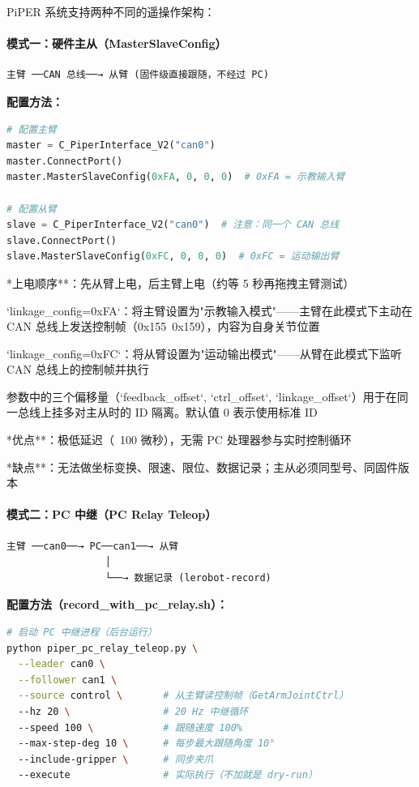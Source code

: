 \documentclass[UTF8,a4paper,11pt]{ctexart}
\begin{document}
PiPER 系统支持两种不同的遥操作架构：

\paragraph{模式一：硬件主从（MasterSlaveConfig）}


\begin{lstlisting}[language=text]
  主臂 ──CAN 总线──→ 从臂 (固件级直接跟随，不经过 PC)
\end{lstlisting}

\textbf{配置方法：}
\begin{lstlisting}[language=python]
# 配置主臂
master = C_PiperInterface_V2("can0")
master.ConnectPort()
master.MasterSlaveConfig(0xFA, 0, 0, 0)  # 0xFA = 示教输入臂

# 配置从臂
slave = C_PiperInterface_V2("can0")  # 注意：同一个 CAN 总线
slave.ConnectPort()
slave.MasterSlaveConfig(0xFC, 0, 0, 0)  # 0xFC = 运动输出臂
\end{lstlisting}

\item **上电顺序**：先从臂上电，后主臂上电（约等 5 秒再拖拽主臂测试）
\item `linkage_config=0xFA`：将主臂设置为"示教输入模式"——主臂在此模式下主动在 CAN 总线上发送控制帧（0x155~0x159），内容为自身关节位置
\item `linkage_config=0xFC`：将从臂设置为"运动输出模式"——从臂在此模式下监听 CAN 总线上的控制帧并执行
\item 参数中的三个偏移量（`feedback_offset`, `ctrl_offset`, `linkage_offset`）用于在同一总线上挂多对主从时的 ID 隔离。默认值 0 表示使用标准 ID
\item **优点**：极低延迟（~100 微秒），无需 PC 处理器参与实时控制循环
\item **缺点**：无法做坐标变换、限速、限位、数据记录；主从必须同型号、同固件版本

\paragraph{模式二：PC 中继（PC Relay Teleop）}


\begin{lstlisting}[language=text]
  主臂 ──can0──→ PC──can1──→ 从臂
                 │
                 └──→ 数据记录 (lerobot-record)
\end{lstlisting}

\textbf{配置方法（record_with_pc_relay.sh）：}
\begin{lstlisting}[language=bash]
# 启动 PC 中继进程（后台运行）
python piper_pc_relay_teleop.py \
  --leader can0 \
  --follower can1 \
  --source control \       # 从主臂读控制帧（GetArmJointCtrl）
  --hz 20 \                # 20 Hz 中继循环
  --speed 100 \            # 跟随速度 100%
  --max-step-deg 10 \      # 每步最大跟随角度 10°
  --include-gripper \      # 同步夹爪
  --execute                # 实际执行（不加就是 dry-run）
\end{lstlisting}
\end{document}

